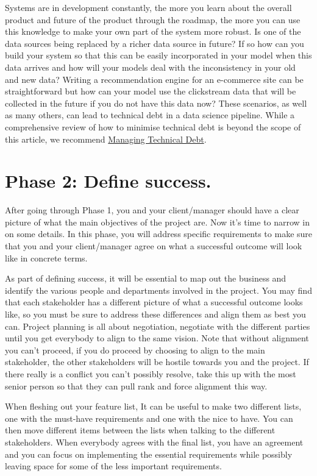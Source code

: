 \documentclass[
]{book}
\begin{document}
Systems are in development constantly, the more you learn about the overall product and future of the product through the roadmap, the more you can use this knowledge to make your own part of the system more robust. Is one of the data sources being replaced by a richer data source in future? If so how can you build your system so that this can be easily incorporated in your model when this data arrives and how will your models deal with the inconsistency in your old and new data? Writing a recommendation engine for an e-commerce site can be straightforward but how can your model use the clickstream data that will be collected in the future if you do not have this data now? These scenarios, as well as many others, can lead to technical debt in a data science pipeline. While a comprehensive review of how to minimise technical debt is beyond the scope of this article, we recommend \href{https://www.amazon.com/Managing-Technical-Debt-Development-Engineering/dp/013564593X}{Managing Technical Debt}.

\hypertarget{phase-2-define-success.}{%
\section{Phase 2: Define success.}\label{phase-2-define-success.}}

After going through Phase 1, you and your client/manager should have a clear picture of what the main objectives of the project are. Now it's time to narrow in on some details. In this phase, you will address specific requirements to make sure that you and your client/manager agree on what a successful outcome will look like in concrete terms.

As part of defining success, it will be essential to map out the business and identify the various people and departments involved in the project. You may find that each stakeholder has a different picture of what a successful outcome looks like, so you must be sure to address these differences and align them as best you can. Project planning is all about negotiation, negotiate with the different parties until you get everybody to align to the same vision. Note that without alignment you can't proceed, if you do proceed by choosing to align to the main stakeholder, the other stakeholders will be hostile towards you and the project. If there really is a conflict you can't possibly resolve, take this up with the most senior person so that they can pull rank and force alignment this way.

When fleshing out your feature list, It can be useful to make two different lists, one with the must-have requirements and one with the nice to have. You can then move different items between the lists when talking to the different stakeholders. When everybody agrees with the final list, you have an agreement and you can focus on implementing the essential requirements while possibly leaving space for some of the less important requirements.
\end{document}
